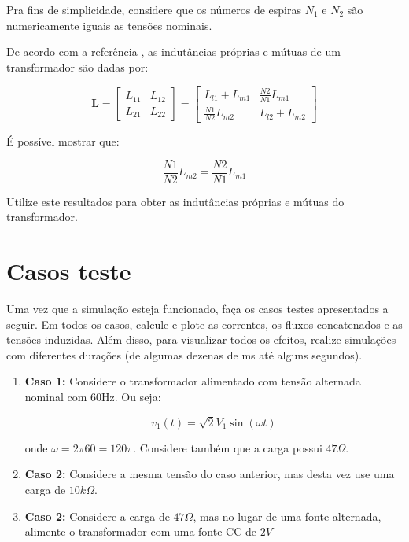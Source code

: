 \documentclass[a4paper]{article}
\theoremstyle{definition}
\theoremstyle{plain}
\begin{document}
Pra fins de simplicidade, considere que os números de espiras $N_1$ e $N_2$ são numericamente iguais as tensões nominais.

De acordo com a referência \cite[Capítulo 1]{krause2013analysis}, as indutâncias próprias e mútuas de um transformador são dadas por:

\begin{equation}
\mathbf{L} = 
\begin{bmatrix}L_{11} & L_{12}\\[5pt] 
L_{21} & L_{22}\end{bmatrix} = 
\begin{bmatrix}L_{l1}+L_{m1} & \frac{N2}{N1} L_{m1}\\[5pt] 
\frac{N1}{N2} L_{m2} & L_{l2}+L_{m2}\end{bmatrix}
\end{equation}


É possível mostrar que:

\begin{equation}
\frac{N1}{N2} L_{m2} = \frac{N2}{N1} L_{m1}
\end{equation}


Utilize este resultados para obter as indutâncias próprias e mútuas do transformador.

\section{Casos teste}

Uma vez que a simulação esteja funcionado, faça os casos testes apresentados a seguir. Em todos os casos, calcule e plote as correntes, os fluxos concatenados e as tensões induzidas. Além disso, para visualizar todos os efeitos, realize simulações com diferentes durações (de algumas dezenas de ms até alguns segundos).


\begin{enumerate}
\item \textbf{Caso 1:} Considere o transformador alimentado com tensão alternada nominal com 60Hz. Ou seja:

\begin{equation}
v_1(t) = \sqrt{2}V_1 \sin(\omega t)
\end{equation}

onde $\omega = 2 \pi 60 = 120\pi$. Considere também que a carga possui $47\Omega$.

\item \textbf{Caso 2:} Considere a mesma tensão do caso anterior, mas desta vez use uma carga de $10k\Omega$.


\item \textbf{Caso 2:} Considere a carga de $47\Omega$, mas no lugar de uma fonte alternada, alimente o transformador com uma fonte CC de $2V$ 

\end{enumerate}











\end{document}
